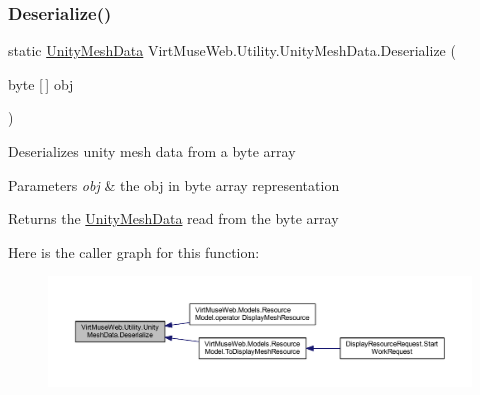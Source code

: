 \subsubsection{\texorpdfstring{Deserialize()}{Deserialize()}\hspace{0.1cm}{\footnotesize\ttfamily [1/2]}}
{\footnotesize\ttfamily static \mbox{\hyperlink{class_virt_muse_web_1_1_utility_1_1_unity_mesh_data}{Unity\+Mesh\+Data}} Virt\+Muse\+Web.\+Utility.\+Unity\+Mesh\+Data.\+Deserialize (\begin{DoxyParamCaption}\item[{byte \mbox{[}$\,$\mbox{]}}]{obj }\end{DoxyParamCaption})\hspace{0.3cm}{\ttfamily [static]}}



Deserializes unity mesh data from a byte array 


\begin{DoxyParams}{Parameters}
{\em obj} & the obj in byte array representation\\
\hline
\end{DoxyParams}
\begin{DoxyReturn}{Returns}
the \mbox{\hyperlink{class_virt_muse_web_1_1_utility_1_1_unity_mesh_data}{Unity\+Mesh\+Data}} read from the byte array
\end{DoxyReturn}
Here is the caller graph for this function\+:
\nopagebreak
\begin{figure}[H]
\begin{center}
\leavevmode
\includegraphics[width=350pt]{class_virt_muse_web_1_1_utility_1_1_unity_mesh_data_a72d47231711a93e536a91a202d07caef_icgraph}
\end{center}
\end{figure}
\mbox{\label{class_virt_muse_web_1_1_utility_1_1_unity_mesh_data_abfb03456d3f2baa170d038b6d189fbab}} 
